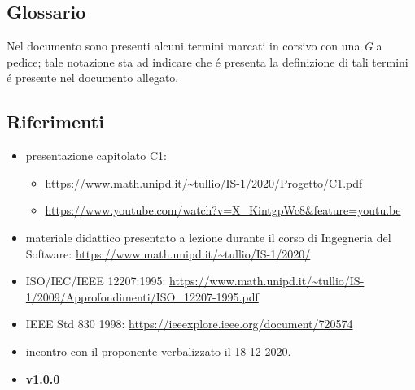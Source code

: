 \subsection{Glossario}
Nel documento sono presenti alcuni termini marcati in corsivo con una \emph{G} a pedice; tale notazione sta ad indicare che \'{e} presenta la definizione di tali termini \'{e} presente nel documento \Gv{} allegato.

\subsection{Riferimenti}
\begin{itemize}
    \item presentazione capitolato C1:
    \begin{itemize} 
        \item \url{https://www.math.unipd.it/~tullio/IS-1/2020/Progetto/C1.pdf}
        \item \url{https://www.youtube.com/watch?v=X_KintgpWc8&feature=youtu.be}
    \end{itemize}
    \item materiale didattico presentato a lezione durante il corso di Ingegneria del Software: \url{https://www.math.unipd.it/~tullio/IS-1/2020/}
    \item ISO/IEC/IEEE 12207:1995: \url{https://www.math.unipd.it/~tullio/IS-1/2009/Approfondimenti/ISO_12207-1995.pdf}
    \item IEEE Std 830 1998: \url{https://ieeexplore.ieee.org/document/720574}
    \item incontro con il proponente verbalizzato il 18-12-2020.
    \item \textbf{\NdP} \textbf{v1.0.0}
\end{itemize}